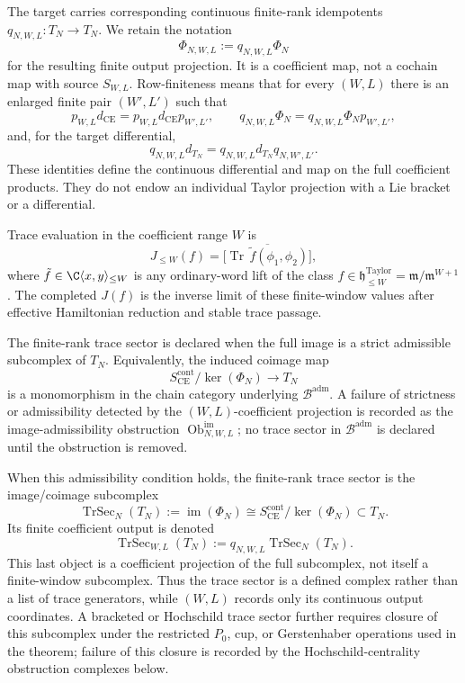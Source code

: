 \begin{defn}
  The target carries corresponding continuous finite-rank idempotents
  \(q_{N,W,L}\colon T_N\to T_N\).  We retain the notation
  \[
    \Phi_{N,W,L}:=q_{N,W,L}\Phi_N
  \]
  for the resulting finite output projection.  It is a coefficient map,
  not a cochain map with source \(S_{W,L}\).  Row-finiteness means that
  for every \((W,L)\) there is an enlarged finite pair
  \((W',L')\) such that
  \[
    p_{W,L}d_{\mathrm{CE}}
      =p_{W,L}d_{\mathrm{CE}}p_{W',L'},
    \qquad
    q_{N,W,L}\Phi_N
      =q_{N,W,L}\Phi_Np_{W',L'},
  \]
  and, for the target differential,
  \[
    q_{N,W,L}d_{T_N}
      =q_{N,W,L}d_{T_N}q_{N,W',L'}.
  \]
  These identities define the continuous differential and map on the
  full coefficient products.  They do not endow an individual Taylor
  projection with a Lie bracket or a differential.

  Trace evaluation in the coefficient range \(W\) is
  \[
    J_{\leq W}(f)
      =
      \bigl[
        \overline{\operatorname{Tr}\,\tilde f(\phi_1,\phi_2)}
      \bigr],
  \]
  where \(\tilde f\in\C\langle x,y\rangle_{\leq W}\) is any
  ordinary-word lift of the class
  \(f\in\mathfrak h^{\mathrm{Taylor}}_{\leq W}=\mathfrak m/\mathfrak m^{W+1}\).  The
  completed \(J(f)\) is the inverse limit of these finite-window values
  after effective Hamiltonian reduction and stable trace passage.

  The finite-rank trace sector is declared when the full image is a
  strict admissible subcomplex of \(T_N\).  Equivalently, the induced
  coimage map
  \[
    S_{\mathrm{CE}}^{\mathrm{cont}}/\ker(\Phi_N)
    \longrightarrow T_N
  \]
  is a monomorphism in the chain category underlying
  \(\mathcal B^{\mathrm{adm}}\).  A failure of strictness or
  admissibility detected by the \((W,L)\)-coefficient projection is
  recorded as the
  image-admissibility obstruction
  \(\operatorname{Ob}^{\mathrm{im}}_{N,W,L}\); no trace sector in
  \(\mathcal B^{\mathrm{adm}}\) is declared until the obstruction is
  removed.

  When this admissibility condition holds, the finite-rank trace sector
  is the image/coimage subcomplex
  \[
    \operatorname{TrSec}_N(T_N)
    :=
    \operatorname{im}(\Phi_N)
    \cong
    S_{\mathrm{CE}}^{\mathrm{cont}}/\ker(\Phi_N)
    \subset T_N.
  \]
  Its finite coefficient output is denoted
  \[
    \operatorname{TrSec}_{W,L}(T_N)
    :=q_{N,W,L}\operatorname{TrSec}_N(T_N).
  \]
  This last object is a coefficient projection of the full subcomplex,
  not itself a finite-window subcomplex.  Thus the trace sector is a
  defined complex rather than a list of trace generators, while
  \((W,L)\) records only its continuous output coordinates.
  A bracketed or Hochschild trace sector further requires closure of
  this subcomplex under the restricted \(P_0\), cup, or Gerstenhaber
  operations used in the theorem; failure of this closure is recorded
  by the Hochschild-centrality obstruction complexes below.


\end{defn}
